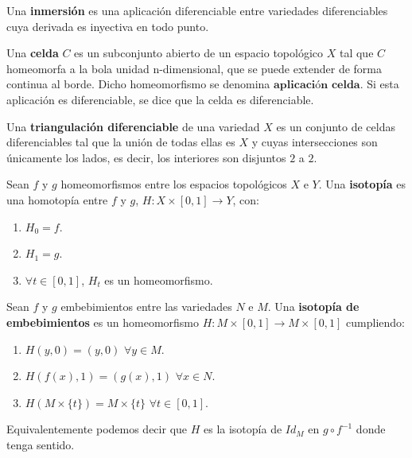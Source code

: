 \begin{definicion} Una \textbf{inmersión} es una aplicación diferenciable entre variedades diferenciables cuya derivada es inyectiva en todo punto.
\end{definicion}

\begin{definicion} Una \textbf{celda} $C$ es un subconjunto abierto de un espacio topológico $X$ tal que $C$ homeomorfa a la bola unidad n-dimensional, que se puede extender de forma continua al borde. Dicho homeomorfismo se denomina $\textbf{aplicación celda}$. Si esta aplicación es diferenciable, se dice que la celda es diferenciable.
\end{definicion}

\begin{definicion} Una \textbf{triangulación diferenciable} de una variedad $X$ es un conjunto de celdas diferenciables tal que la unión de todas ellas es $X$ y cuyas intersecciones son únicamente los lados, es decir, los interiores son disjuntos $2$ a $2$.
\end{definicion}

\begin{definicion} Sean $f$ y $g$ homeomorfismos entre los espacios topológicos $X$ e $Y$. Una \textbf{isotopía} es una homotopía entre $f$ y $g$, $H: X \times [0,1] \rightarrow Y$, con:
	\begin{enumerate}
		\item $H_0 = f$.
		\item $H_1 = g$.
		\item $\forall t \in [0,1]$, $H_t$ es un homeomorfismo.
	\end{enumerate}
\end{definicion}

\begin{definicion} Sean $f$ y $g$ embebimientos entre las variedades $N$ e $M$. Una \textbf{isotopía de embebimientos} es un homeomorfismo $H: M \times [0,1] \rightarrow M \times [0,1]$ cumpliendo:
	\begin{enumerate}
		\item $H(y, 0) = (y, 0)$ $\forall y \in M$.
		\item $H(f(x), 1) = (g(x), 1)$ $\forall x \in N$.
		\item $H(M \times \{t\}) = M \times \{t\}$ $\forall t \in [0,1]$.
	\end{enumerate}
	
	Equivalentemente podemos decir que $H$ es la isotopía de $Id_M$ en $g \circ f^{-1}$ donde tenga sentido.
\end{definicion}

